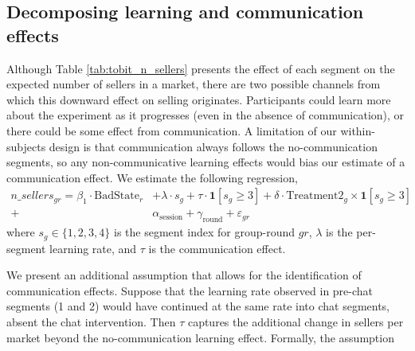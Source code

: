 \documentclass[thesis]{uathesis}
\begin{document}
\begin{body}


\subsection{Decomposing learning and communication effects}

Although Table \ref{tab:tobit_n_sellers} presents the effect of each segment on the expected number of sellers in a market, there are two possible channels from which this downward effect on selling originates. Participants could learn more about the experiment as it progresses (even in the absence of communication), or there could be some effect from communication. A limitation of our within-subjects design is that communication always follows the no-communication segments, so any non-communicative learning effects would bias our estimate of a communication effect. We estimate the following regression,
\begin{equation}
  \begin{split}
n\_sellers_{gr} = \beta_1 \cdot \text{BadState}_r &+ \lambda \cdot s_g + \tau \cdot \mathbf{1}[s_g \geq 3] + \delta \cdot \text{Treatment2}_g \times \mathbf{1}[s_g \geq 3] \\+
  &\alpha_{\text{session}} + \gamma_{\text{round}} + \varepsilon_{gr}
    \end{split}
  \label{eq:comms}
\end{equation}
where $s_g \in \{1, 2, 3, 4\}$ is the segment index for group-round $gr$, $\lambda$ is the per-segment learning rate, and $\tau$ is the communication effect.

We present an additional assumption that allows for the identification of communication effects. Suppose that the learning rate observed in pre-chat segments (1 and 2) would have continued at the same rate into chat segments, absent the chat intervention. Then $\tau$ captures the additional change in sellers per market beyond the no-communication learning effect. Formally, the assumption


\end{body}
\end{document}
